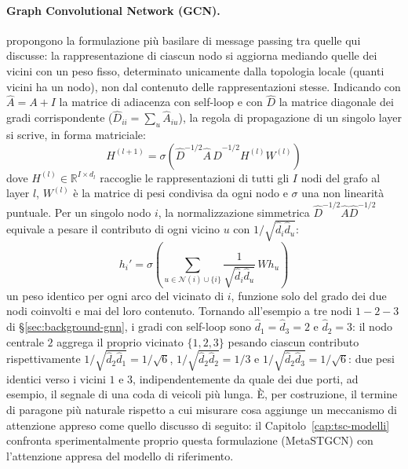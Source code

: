 \paragraph{Graph Convolutional Network (GCN).} \citet{kipf2017gcn}
propongono la formulazione più basilare di message passing tra quelle qui
discusse: la rappresentazione di ciascun nodo si aggiorna mediando quelle
dei vicini con un peso fisso, determinato unicamente dalla topologia
locale (quanti vicini ha un nodo), non dal contenuto delle
rappresentazioni stesse. Indicando con $\hat A = A + I$ la matrice di
adiacenza con self-loop e con $\hat D$ la matrice diagonale dei gradi
corrispondente ($\hat D_{ii} = \sum_u \hat A_{iu}$), la regola di
propagazione di un singolo layer si scrive, in forma matriciale:
\begin{equation}
  H^{(l+1)} = \sigma\!\left(\hat D^{-1/2} \hat A\, \hat D^{-1/2} H^{(l)} W^{(l)}\right)
  \label{eq:gcn-propagation}
\end{equation}
dove $H^{(l)} \in \mathbb{R}^{I \times d_l}$ raccoglie le rappresentazioni
di tutti gli $I$ nodi del grafo al layer $l$, $W^{(l)}$ è la matrice di
pesi condivisa da ogni nodo e $\sigma$ una non linearità puntuale. Per un
singolo nodo $i$, la normalizzazione simmetrica $\hat D^{-1/2}\hat
A\hat D^{-1/2}$ equivale a pesare il contributo di ogni vicino $u$ con
$1/\sqrt{\hat d_i \hat d_u}$:
\begin{equation}
  h_i' = \sigma\!\left(\sum_{u \in \mathcal{N}(i) \cup \{i\}}
    \frac{1}{\sqrt{\hat d_i \hat d_u}}\, W h_u\right)
  \label{eq:gcn-aggregate}
\end{equation}
un peso identico per ogni arco del vicinato di $i$, funzione solo del
grado dei due nodi coinvolti e mai del loro contenuto. Tornando all'esempio
a tre nodi $1-2-3$ di §\ref{sec:background-gnn}, i gradi con self-loop sono
$\hat d_1 = \hat d_3 = 2$ e $\hat d_2 = 3$: il nodo centrale $2$ aggrega il
proprio vicinato $\{1,2,3\}$ pesando ciascun contributo rispettivamente
$1/\sqrt{\hat d_2 \hat d_1} = 1/\sqrt{6}$, $1/\sqrt{\hat d_2 \hat d_2} =
1/3$ e $1/\sqrt{\hat d_2 \hat d_3} = 1/\sqrt{6}$: due pesi identici verso i
vicini $1$ e $3$, indipendentemente da quale dei due porti, ad esempio, il
segnale di una coda di veicoli più lunga. È, per costruzione,
il termine di paragone più naturale rispetto a cui misurare cosa aggiunge
un meccanismo di attenzione appreso come quello discusso di seguito: il
Capitolo~\ref{cap:tsc-modelli} confronta sperimentalmente proprio questa
formulazione (MetaSTGCN) con l'attenzione appresa del modello di
riferimento.

